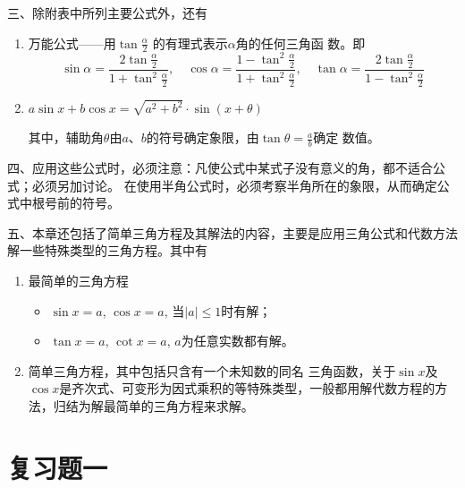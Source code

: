 三、除附表中所列主要公式外，还有
\begin{enumerate}
    \item 万能公式——用$\tan\frac{\alpha}{2}$
的有理式表示$\alpha$角的任何三角函
数。即
\[\sin\alpha=\frac{2\tan\frac{\alpha}{2}}{1+\tan^2\frac{\alpha}{2}},\quad \cos\alpha=\frac{1-\tan^2\frac{\alpha}{2}}{1+\tan^2\frac{\alpha}{2}},\quad \tan\alpha=\frac{2\tan\frac{\alpha}{2}}{1-\tan^2\frac{\alpha}{2}} \]

\item $a\sin x+b\cos x=\sqrt{a^2+b^2}\cdot \sin(x+\theta)$

其中，辅助角$\theta$由$a$、$b$的符号确定象限，由$\tan\theta=\frac{a}{b}$确定
数值。
\end{enumerate}

四、应用这些公式时，必须注意：凡使公式中某式子没有意义的角，都不适合公式；必须另加讨论。
在使用半角公式时，必须考察半角所在的象限，从而确定公式中根号前的符号。

五、本章还包括了简单三角方程及其解法的内容，主要是应用三角公式和代数方法解一些特殊类型的三角方程。其中有
\begin{enumerate}
    \item 最简单的三角方程
    \begin{itemize}
        \item $\sin x=a$, $\cos x=a$, 当$|a|\le 1$时有解；
        \item $\tan x=a$, $\cot x=a$, $a$为任意实数都有解。
    \end{itemize}

\item 简单三角方程，其中包括只含有一个未知数的同名
三角函数，关于$\sin x$及$\cos x$是齐次式、可变形为因式乘积的等特殊类型，一般都用解代数方程的方法，归结为解最简单的三角方程来求解。
\end{enumerate}

\section*{复习题一}

